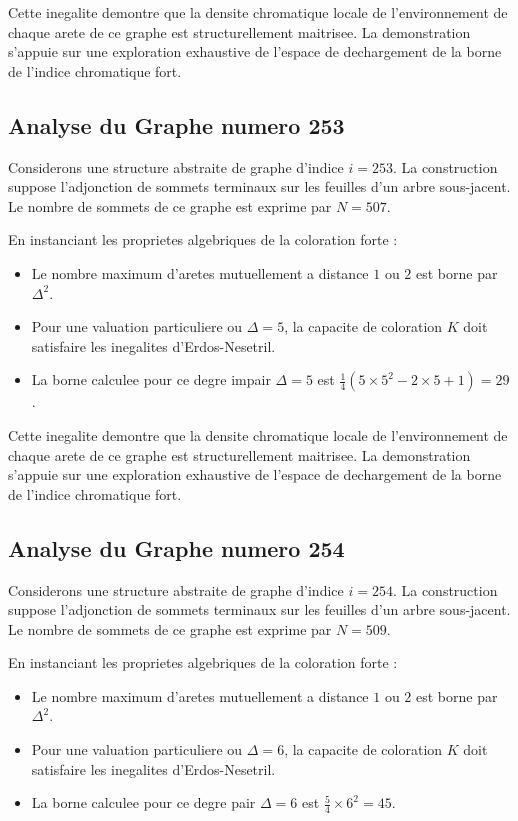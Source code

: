 \documentclass[11pt,a4paper]{article}
\begin{document}
Cette inegalite demontre que la densite chromatique locale de l'environnement de chaque arete de ce graphe est structurellement maitrisee. La demonstration s'appuie sur une exploration exhaustive de l'espace de dechargement de la borne de l'indice chromatique fort.

\subsection{Analyse du Graphe numero 253}
Considerons une structure abstraite de graphe d'indice $i = 253$. La construction suppose l'adjonction de sommets terminaux sur les feuilles d'un arbre sous-jacent. Le nombre de sommets de ce graphe est exprime par $N = 507$.

En instanciant les proprietes algebriques de la coloration forte :
\begin{itemize}
\item Le nombre maximum d'aretes mutuellement a distance $1$ ou $2$ est borne par $\Delta^2$.
\item Pour une valuation particuliere ou $\Delta = 5$, la capacite de coloration $K$ doit satisfaire les inegalites d'Erdos-Nesetril.
\item La borne calculee pour ce degre impair $\Delta = 5$ est $\frac{1}{4}(5 \times 5^2 - 2 \times 5 + 1) = 29$.
\end{itemize}

Cette inegalite demontre que la densite chromatique locale de l'environnement de chaque arete de ce graphe est structurellement maitrisee. La demonstration s'appuie sur une exploration exhaustive de l'espace de dechargement de la borne de l'indice chromatique fort.

\subsection{Analyse du Graphe numero 254}
Considerons une structure abstraite de graphe d'indice $i = 254$. La construction suppose l'adjonction de sommets terminaux sur les feuilles d'un arbre sous-jacent. Le nombre de sommets de ce graphe est exprime par $N = 509$.

En instanciant les proprietes algebriques de la coloration forte :
\begin{itemize}
\item Le nombre maximum d'aretes mutuellement a distance $1$ ou $2$ est borne par $\Delta^2$.
\item Pour une valuation particuliere ou $\Delta = 6$, la capacite de coloration $K$ doit satisfaire les inegalites d'Erdos-Nesetril.
\item La borne calculee pour ce degre pair $\Delta = 6$ est $\frac{5}{4} \times 6^2 = 45$.
\end{itemize}
\end{document}

